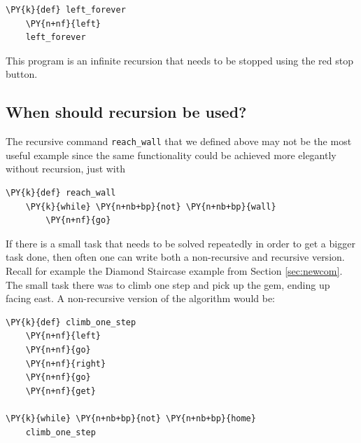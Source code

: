 \begin{bbox}
\begin{Verbatim}[commandchars=\\\{\}]
\PY{k}{def} left_forever
    \PY{n+nf}{left}
    left_forever
\end{Verbatim}
\end{bbox}
\vspace{6mm}

\noindent
This program is an infinite recursion that needs to be stopped using the 
red stop button.

\subsection[\ \ When should recursion be used?]{When should recursion be used?}

The recursive command {\tt reach\_wall} that we defined above may not be the most useful example 
since the same functionality could be achieved more elegantly without recursion, just with\\

\begin{bbox}
\begin{Verbatim}[commandchars=\\\{\}]
\PY{k}{def} reach_wall
    \PY{k}{while} \PY{n+nb+bp}{not} \PY{n+nb+bp}{wall}
        \PY{n+nf}{go}
\end{Verbatim}
\end{bbox}
\vspace{6mm}

\noindent
If there is a small task that needs to be solved repeatedly in order to get a bigger task done,
then often one can write both a non-recursive and recursive version. Recall for example the Diamond
Staircase example from Section \ref{sec:newcom}. The small task there was to climb one step and pick 
up the gem, ending up facing east. A non-recursive version of the algorithm would be:\\

\begin{bbox}
\begin{Verbatim}[commandchars=\\\{\}]
\PY{k}{def} climb_one_step
    \PY{n+nf}{left}
    \PY{n+nf}{go}
    \PY{n+nf}{right}
    \PY{n+nf}{go}
    \PY{n+nf}{get}

\PY{k}{while} \PY{n+nb+bp}{not} \PY{n+nb+bp}{home}
    climb_one_step
\end{Verbatim}
\end{bbox}
\vspace{6mm}

